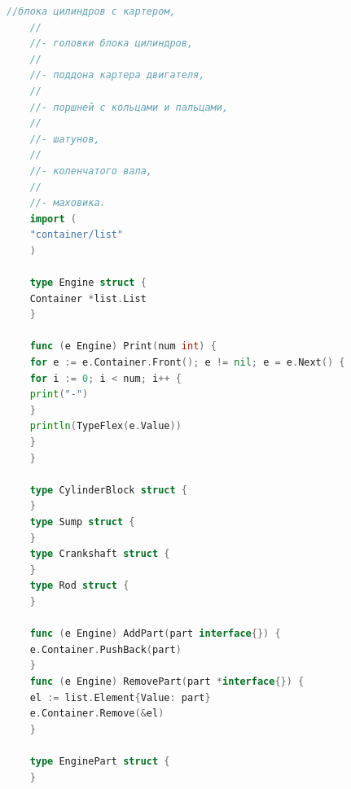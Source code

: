 \documentclass[PI,LAB]{HSEUniversity}
\begin{document}
\begin{lstlisting}[language=Go]
    //блока цилиндров с картером,
    //
    //- головки блока цилиндров,
    //
    //- поддона картера двигателя,
    //
    //- поршней с кольцами и пальцами,
    //
    //- шатунов,
    //
    //- коленчатого вала,
    //
    //- маховика.
    import (
    "container/list"
    )
    
    type Engine struct {
    Container *list.List
    }
    
    func (e Engine) Print(num int) {
    for e := e.Container.Front(); e != nil; e = e.Next() {
    for i := 0; i < num; i++ {
    print("-")
    }
    println(TypeFlex(e.Value))
    }
    }
    
    type CylinderBlock struct {
    }
    type Sump struct {
    }
    type Crankshaft struct {
    }
    type Rod struct {
    }
    
    func (e Engine) AddPart(part interface{}) {
    e.Container.PushBack(part)
    }
    func (e Engine) RemovePart(part *interface{}) {
    el := list.Element{Value: part}
    e.Container.Remove(&el)
    }
    
    type EnginePart struct {
    }
    
    \end{lstlisting}
\end{document}
